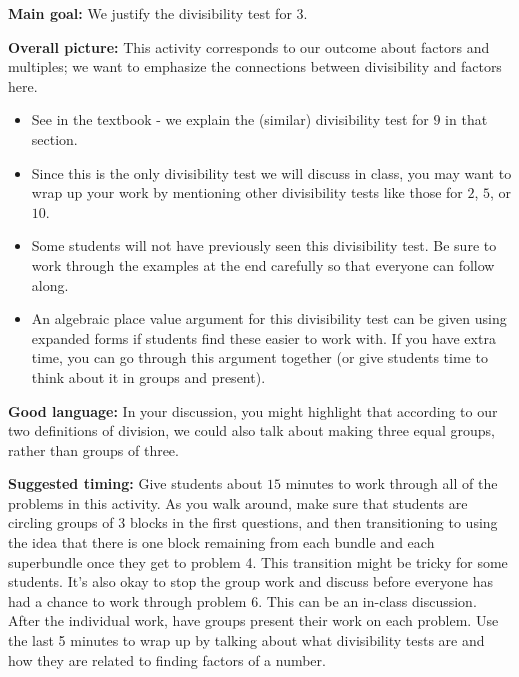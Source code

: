 \documentclass[nooutcomes,noauthor]{ximera}
\begin{document}
\begin{instructorNotes} 



{\bf Main goal:} We justify the divisibility test for 3.


{\bf Overall picture:} This activity corresponds to our outcome about factors and multiples; we want to emphasize the connections between divisibility and factors here. 

\begin{itemize}
	\item See  in the textbook - we explain the (similar) divisibility test for $9$ in that section.
	\item Since this is the only divisibility test we will discuss in class, you may want to wrap up your work by mentioning other divisibility tests like those for $2$, $5$, or $10$.
	\item Some students will not have previously seen this divisibility test. Be sure to work through the examples at the end carefully so that everyone can follow along.
	\item An algebraic place value argument for this divisibility test can be given using expanded forms if students find these easier to work with. If you have extra time, you can go through this argument together (or give students time to think about it in groups and present).
\end{itemize}


{\bf Good language:}  In your discussion, you might highlight that according to our two definitions of division, we could also talk about making three equal groups, rather than groups of three.


{\bf Suggested timing:} Give students about $15$ minutes to work through all of the problems in this activity. As you walk around, make sure that students are circling groups of $3$ blocks in the first questions, and then transitioning to using the idea that there is one block remaining from each bundle and each superbundle once they get to problem 4. This transition might be tricky for some students. It's also okay to stop the group work and discuss before everyone has had a chance to work through problem 6. This can be an in-class discussion. After the individual work, have groups present their work on each problem. Use the last 5 minutes to wrap up by talking about what divisibility tests are and how they are related to finding factors of a number. 




\end{instructorNotes}
\end{document}
